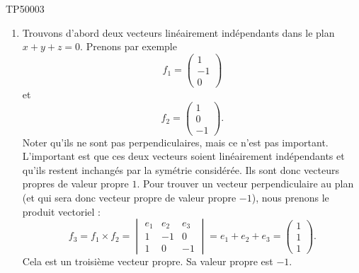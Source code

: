 \begin{corrige}{TP50003}
\begin{enumerate}
		\item
			Trouvons d'abord deux vecteurs linéairement indépendants dans le plan $x+y+z=0$. Prenons par exemple
			\begin{equation}
				f_1=\begin{pmatrix}
					1	\\ 
					-1	\\ 
					0	
				\end{pmatrix}
			\end{equation}
			et
			\begin{equation}
				f_2=\begin{pmatrix}
					1	\\ 
					0	\\ 
					-1	
				\end{pmatrix}.
			\end{equation}
			Noter qu'ils ne sont pas perpendiculaires, mais ce n'est pas important. L'important est que ces deux vecteurs soient linéairement indépendants et qu'ils restent inchangés par la symétrie considérée. Ils sont donc vecteurs propres de valeur propre $1$.
			Pour trouver un vecteur perpendiculaire au plan (et qui sera donc vecteur propre de valeur propre $-1$), nous prenons le produit vectoriel :
			\begin{equation}
				f_3=f_1\times f_2=\begin{vmatrix}
					e_1	&	e_2	&	e_3	\\
					1	&	-1	&	0	\\
					1	&	0	&	-1
				\end{vmatrix}=e_1+e_2+e_3=\begin{pmatrix}
					1	\\ 
					1	\\ 
					1	
				\end{pmatrix}.
			\end{equation}
			Cela est un troisième vecteur propre. Sa valeur propre est $-1$.


\end{enumerate}
\end{corrige}
